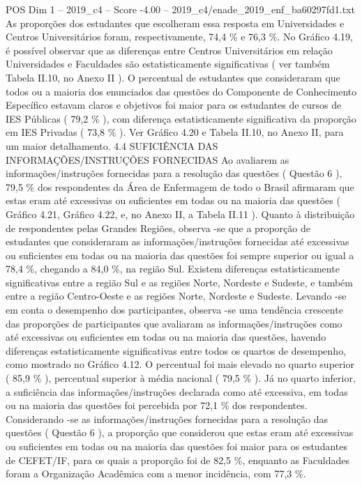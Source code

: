 \begin{textsample}{POS Dim 1 – 2019\_c4 – Score -4.00 – 2019\_c4/enade\_2019\_enf\_ba60297fd1.txt}
As proporções dos estudantes que escolheram essa resposta em Universidades e Centros Universitários foram, respectivamente, 74,4 \% e 76,3 \%.
No Gráfico 4.19, é possível observar que as diferenças entre Centros Universitários em relação Universidades e Faculdades são estatisticamente significativas ( ver também Tabela II.10, no Anexo II ).
O percentual de estudantes que consideraram que todos ou a maioria dos enunciados das questões do Componente de Conhecimento Específico estavam claros e objetivos foi maior para os estudantes de cursos de IES Públicas ( 79,2 \% ), com diferença estatisticamente significativa da proporção em IES Privadas ( 73,8 \% ).
Ver Gráfico 4.20 e Tabela II.10, no Anexo II, para um maior detalhamento. 4.4 SUFICIÊNCIA DAS INFORMAÇÕES/INSTRUÇÕES FORNECIDAS Ao avaliarem as informações/instruções fornecidas para a resolução das questões ( Questão 6 ), 79,5 \% dos respondentes da Área de Enfermagem de todo o Brasil afirmaram que estas eram até excessivas ou suficientes em todas ou na maioria das questões ( Gráfico 4.21, Gráfico 4.22, e, no Anexo II, a Tabela II.11 ).
Quanto à distribuição de respondentes pelas Grandes Regiões, observa -se que a proporção de estudantes que consideraram as informações/instruções fornecidas até excessivas ou suficientes em todas ou na maioria das questões foi sempre superior ou igual a 78,4 \%, chegando a 84,0 \%, na região Sul.
Existem diferenças estatisticamente significativas entre a região Sul e as regiões Norte, Nordeste e Sudeste, e também entre a região Centro-Oeste e as regiões Norte, Nordeste e Sudeste.
Levando -se em conta o desempenho dos participantes, observa -se uma tendência crescente das proporções de participantes que avaliaram as informações/instruções como até excessivas ou suficientes em todas ou na maioria das questões, havendo diferenças estatisticamente significativas entre todos os quartos de desempenho, como mostrado no Gráfico 4.12.
O percentual foi mais elevado no quarto superior ( 85,9 \% ), percentual superior à média nacional ( 79,5 \% ).
Já no quarto inferior, a suficiência das informações/instruções declarada como até excessiva, em todas ou na maioria das questões foi percebida por 72,1 \% dos respondentes.
Considerando -se as informações/instruções fornecidas para a resolução das questões ( Questão 6 ), a proporção que considerou que estas eram até excessivas ou suficientes em todas ou na maioria das questões foi maior para os estudantes de CEFET/IF, para os quais a proporção foi de 82,5 \%, enquanto as Faculdades foram a Organização Acadêmica com a menor incidência, com 77,3 \%.

\end{textsample}
